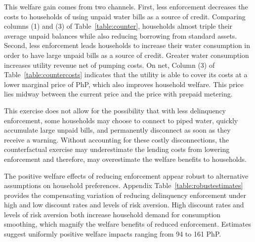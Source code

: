 \documentclass[12pt,table]{article}
\begin{document}
This welfare gain comes from two channels.  First, less enforcement decreases the costs to households of using unpaid water bills as a source of credit.  Comparing columns (1) and (3) of Table~\ref{table:counter}, households almost triple their average unpaid balances while also reducing borrowing from standard assets.  Second, less enforcement leads households to increase their water consumption in order to have large unpaid bills as a source of credit.  Greater water consumption increases utility revenue net of pumping costs.  On net, Column (3) of Table~\ref{table:countercosts} indicates that the utility is able to cover its costs at a lower marginal price of PhP, which also improves household welfare.  This price lies midway between the current price and the price with prepaid metering.

This exercise does not allow for the possibility that with less delinquency enforcement, some households may choose to connect to piped water, quickly accumulate large unpaid bills, and permanently disconnect as soon as they receive a warning.  Without accounting for these costly disconnections, the counterfactual exercise may underestimate the lending costs from lowering enforcement and therefore, may overestimate the welfare benefits to households.

The positive welfare effects of reducing enforcement appear robust to alternative assumptions on household preferences.  Appendix Table~\ref{table:robustestimates} provides the compensating variation of reducing delinquency enforcement under high and low discount rates and levels of risk aversion.  High discount rates and levels of risk aversion both increase household demand for consumption smoothing, which magnify the welfare benefits of reduced enforcement.  Estimates suggest uniformly positive welfare impacts ranging from 94 to 161 PhP.





\end{document}
